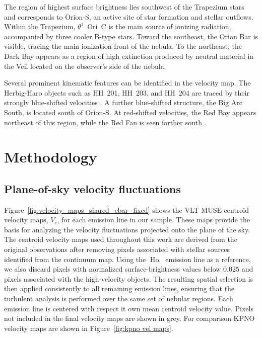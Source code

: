 \documentclass[fleqn,usenatbib, useAMS, a4paper]{mnras}
\newcommand\ha{\ensuremath{\text{H}\upalpha}}
\newcommand\halpha{\ha}
\newcommand\vcentroid{\ensuremath{V_{\text{c}}}}
\begin{document}
The region of highest surface brightness lies southwest of the Trapezium stars and corresponds to Orion-S, an active site of star formation and stellar outflows.
Within the Trapezium, $\theta^1$~Ori~C is the main source of ionizing radiation, accompanied by three cooler B-type stars.
Toward the southeast, the Orion Bar is visible, tracing the main ionization front of the nebula. 
To the northeast, the Dark Bay appears as a region of high extinction produced by neutral material in the Veil located on the observer's side of the nebula.

Several prominent kinematic features can be identified in the velocity map. 
The Herbig-Haro objects such as HH~201, HH~203, and HH~204 are traced by their strongly blue-shifted velocities \citep{Doi:2004a}. 
A further blue-shifted structure, the Big Arc South, is located south of Orion-S. 
At red-shifted velocities, the Red Bay appears northeast of this region, while the Red Fan is seen farther south \citep{Garcia-Diaz:2007a}.



\section{Methodology}\label{sec:met}

\subsection{Plane-of-sky velocity fluctuations}\label{sec:pos fluctuations}


Figure~\ref{fig:velocity_maps_shared_cbar_fixed} shows the VLT MUSE centroid velocity maps, \(\vcentroid\), for each emission line in our sample. 
These maps provide the basis for analyzing the velocity fluctuations projected onto the plane of the sky.
The centroid velocity maps used throughout this work are derived from the original observations after removing pixels associated with stellar sources identified from the continuum map. 
Using the \halpha\ emission line as a reference, we also discard pixels with normalized surface-brightness values below \(0.025\) and pixels associated with the high-velocity objects. 
The resulting spatial selection is then applied consistently to all remaining emission lines, ensuring that the turbulent analysis is performed over the same set of nebular regions. 
Each emission line is centered with respect it own mean centroid velocity value.
Pixels not included in the final velocity maps are shown in grey.
For comparison KPNO velocity maps are shown in Figure~\ref{fig:kpno vel maps}.
\end{document}
